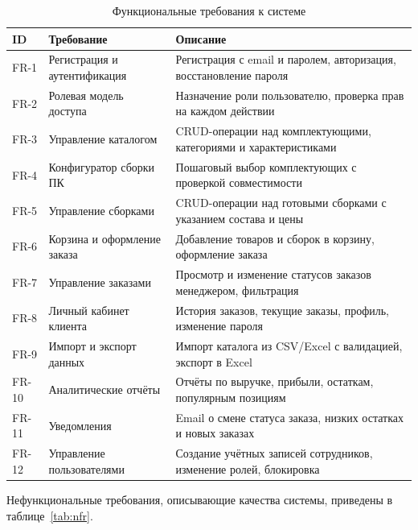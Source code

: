 \begin{table}[ht!]
\caption{Функциональные требования к системе}
\label{tab:fr}
\small
\begin{tabularx}{\textwidth}{|>{\centering\arraybackslash}p{}|>{\RaggedRight\arraybackslash}p{}|>{\RaggedRight\arraybackslash}X|}
\hline
\textbf{ID} & \textbf{Требование} & \textbf{Описание} \\ \hline
FR-1 & Регистрация и аутентификация & Регистрация с email и паролем, авторизация, восстановление пароля \\ \hline
FR-2 & Ролевая модель доступа & Назначение роли пользователю, проверка прав на каждом действии \\ \hline
FR-3 & Управление каталогом & CRUD-операции над комплектующими, категориями и характеристиками \\ \hline
FR-4 & Конфигуратор сборки ПК & Пошаговый выбор комплектующих с проверкой совместимости \\ \hline
FR-5 & Управление сборками & CRUD-операции над готовыми сборками с указанием состава и цены \\ \hline
FR-6 & Корзина и оформление заказа & Добавление товаров и сборок в корзину, оформление заказа \\ \hline
FR-7 & Управление заказами & Просмотр и изменение статусов заказов менеджером, фильтрация \\ \hline
FR-8 & Личный кабинет клиента & История заказов, текущие заказы, профиль, изменение пароля \\ \hline
FR-9 & Импорт и экспорт данных & Импорт каталога из CSV/Excel с валидацией, экспорт в Excel \\ \hline
FR-10 & Аналитические отчёты & Отчёты по выручке, прибыли, остаткам, популярным позициям \\ \hline
FR-11 & Уведомления & Email о смене статуса заказа, низких остатках и новых заказах \\ \hline
FR-12 & Управление пользователями & Создание учётных записей сотрудников, изменение ролей, блокировка \\ \hline
\end{tabularx}
\end{table}

Нефункциональные требования, описывающие качества системы, приведены в таблице~\ref{tab:nfr}.

